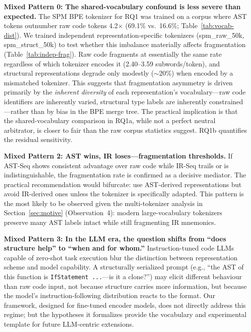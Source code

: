 \documentclass[pdflatex,sn-mathphys,Numbered]{sn-jnl}
\begin{document}
\textbf{Mixed Pattern 0: The shared-vocabulary confound is less severe than expected.} The SPM BPE tokenizer for RQ1 was trained on a corpus where AST tokens outnumber raw code tokens 4.2$\times$ (69.1\% vs.\ 16.6\%; Table~\ref{tab:vocab-dist}). We trained independent representation-specific tokenizers (spm\_raw\_50k, spm\_struct\_50k) to test whether this imbalance materially affects fragmentation (Table~\ref{tab:indep-frag}). Raw code fragments at essentially the same rate regardless of which tokenizer encodes it (2.40--3.59 subwords/token), and structural representations degrade only modestly ($\sim$20\%) when encoded by a mismatched tokenizer. This suggests that fragmentation asymmetry is driven primarily by the \emph{inherent diversity} of each representation's vocabulary---raw code identifiers are inherently varied, structural type labels are inherently constrained---rather than by bias in the BPE merge tree. The practical implication is that the shared-vocabulary comparison in RQ1a, while not a perfect neutral arbitrator, is closer to fair than the raw corpus statistics suggest. RQ1b quantifies the residual sensitivity.

\textbf{Mixed Pattern 2: AST wins, IR loses---fragmentation thresholds.} If AST-Seq shows consistent advantage over raw code while IR-Seq trails or is indistinguishable, the fragmentation rate is confirmed as a decisive mediator. The practical recommendation would bifurcate: use AST-derived representations but avoid IR-derived ones unless the tokenizer is specifically adapted. This pattern is the most likely to be observed given the multi-tokenizer analysis in Section~\ref{sec:motive} (Observation~4): modern large-vocabulary tokenizers preserve many AST labels intact while still fragmenting IR mnemonics.

\textbf{Mixed Pattern 3: In the LLM era, the question shifts from ``does structure help'' to ``when and for whom.''} Instruction-tuned code LLMs capable of zero-shot task execution blur the distinction between representation scheme and model capability. A structurally serialized prompt (e.g., ``the AST of this function is \texttt{IfStatement ...}---is it a clone?'') may elicit different behaviour than raw code input, not because structure carries more information, but because the model's instruction-following distribution reacts to the format. Our framework, designed for fine-tuned encoder models, does not directly address this regime; but the hypotheses it formalizes provide the vocabulary and experimental template for future LLM-centric extensions.
\end{document}
